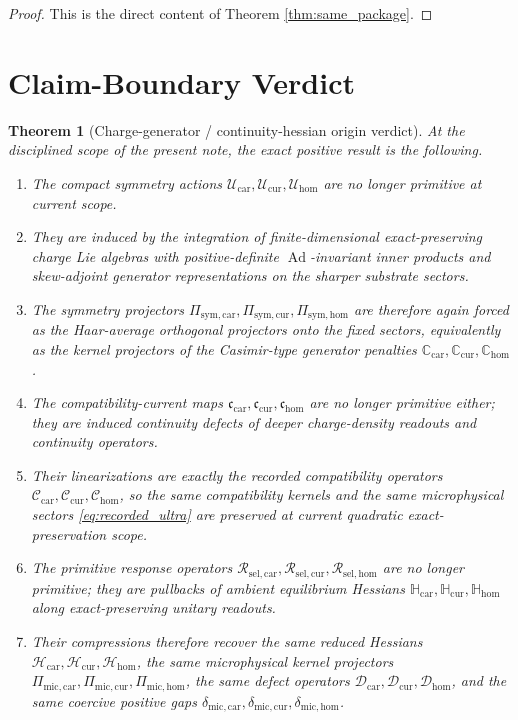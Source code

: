\documentclass[11pt]{article}
\newcommand{\UltraCarProj}{\Pi_{\mathrm{mic,car}}}
\newcommand{\UltraCurProj}{\Pi_{\mathrm{mic,cur}}}
\newcommand{\UltraHomProj}{\Pi_{\mathrm{mic,hom}}}
\newcommand{\UltraCarGap}{\delta_{\mathrm{mic,car}}}
\newcommand{\UltraCurGap}{\delta_{\mathrm{mic,cur}}}
\newcommand{\UltraHomGap}{\delta_{\mathrm{mic,hom}}}
\newcommand{\TensorDefect}{\mathcal D_{\mathrm{car}}}
\newcommand{\CurDefect}{\mathcal D_{\mathrm{cur}}}
\newcommand{\HomDefect}{\mathcal D_{\mathrm{hom}}}
\newcommand{\TensorSymProj}{\Pi_{\mathrm{sym,car}}}
\newcommand{\CurSymProj}{\Pi_{\mathrm{sym,cur}}}
\newcommand{\HomSymProj}{\Pi_{\mathrm{sym,hom}}}
\newcommand{\TensorCompat}{\mathcal C_{\mathrm{car}}}
\newcommand{\CurCompat}{\mathcal C_{\mathrm{cur}}}
\newcommand{\HomCompat}{\mathcal C_{\mathrm{hom}}}
\newcommand{\TensorHess}{\mathcal H_{\mathrm{car}}}
\newcommand{\CurHess}{\mathcal H_{\mathrm{cur}}}
\newcommand{\HomHess}{\mathcal H_{\mathrm{hom}}}
\newcommand{\TensorSymAct}{\mathscr U_{\mathrm{car}}}
\newcommand{\CurSymAct}{\mathscr U_{\mathrm{cur}}}
\newcommand{\HomSymAct}{\mathscr U_{\mathrm{hom}}}
\newcommand{\TensorCurrent}{\mathfrak c_{\mathrm{car}}}
\newcommand{\CurCurrent}{\mathfrak c_{\mathrm{cur}}}
\newcommand{\HomCurrent}{\mathfrak c_{\mathrm{hom}}}
\newcommand{\TensorResp}{\mathcal R_{\mathrm{sel,car}}}
\newcommand{\CurResp}{\mathcal R_{\mathrm{sel,cur}}}
\newcommand{\HomResp}{\mathcal R_{\mathrm{sel,hom}}}
\newcommand{\TensorCasimir}{\mathbb C_{\mathrm{car}}}
\newcommand{\CurCasimir}{\mathbb C_{\mathrm{cur}}}
\newcommand{\HomCasimir}{\mathbb C_{\mathrm{hom}}}
\newcommand{\TensorAmbientHess}{\mathbb H_{\mathrm{car}}}
\newcommand{\CurAmbientHess}{\mathbb H_{\mathrm{cur}}}
\newcommand{\HomAmbientHess}{\mathbb H_{\mathrm{hom}}}
\newtheorem{theorem}{Theorem}
\begin{document}
\begin{proof}
This is the direct content of Theorem \ref{thm:same_package}.
\end{proof}

\section{Claim-Boundary Verdict}

\begin{theorem}[Charge-generator / continuity-hessian origin verdict]
\label{thm:verdict}
At the disciplined scope of the present note, the exact positive result is the following.
\begin{enumerate}
    \item The compact symmetry actions \(\TensorSymAct,\CurSymAct,\HomSymAct\) are no longer primitive at current scope.
    \item They are induced by the integration of finite-dimensional exact-preserving charge Lie algebras with positive-definite \(\operatorname{Ad}\)-invariant inner products and skew-adjoint generator representations on the sharper substrate sectors.
    \item The symmetry projectors \(\TensorSymProj,\CurSymProj,\HomSymProj\) are therefore again forced as the Haar-average orthogonal projectors onto the fixed sectors, equivalently as the kernel projectors of the Casimir-type generator penalties \(\TensorCasimir,\CurCasimir,\HomCasimir\).
    \item The compatibility-current maps \(\TensorCurrent,\CurCurrent,\HomCurrent\) are no longer primitive either; they are induced continuity defects of deeper charge-density readouts and continuity operators.
    \item Their linearizations are exactly the recorded compatibility operators \(\TensorCompat,\CurCompat,\HomCompat\), so the same compatibility kernels and the same microphysical sectors \eqref{eq:recorded_ultra} are preserved at current quadratic exact-preservation scope.
    \item The primitive response operators \(\TensorResp,\CurResp,\HomResp\) are no longer primitive; they are pullbacks of ambient equilibrium Hessians \(\TensorAmbientHess,\CurAmbientHess,\HomAmbientHess\) along exact-preserving unitary readouts.
    \item Their compressions therefore recover the same reduced Hessians \(\TensorHess,\CurHess,\HomHess\), the same microphysical kernel projectors \(\UltraCarProj,\UltraCurProj,\UltraHomProj\), the same defect operators \(\TensorDefect,\CurDefect,\HomDefect\), and the same coercive positive gaps \(\UltraCarGap,\UltraCurGap,\UltraHomGap\).

\end{enumerate}
\end{theorem}
\end{document}
